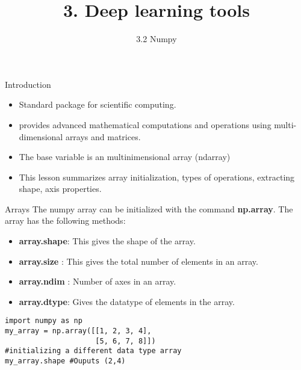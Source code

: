 \documentclass{beamer}
\title{3. Deep learning tools}
\subtitle{3.2 Numpy}
\begin{document}
\maketitle

\begin{frame}{Introduction}
\begin{itemize}
\item Standard package for scientific computing. 
\item provides advanced mathematical computations and operations using multi-dimensional arrays and matrices. 
\item The base variable is an multinimensional array (ndarray)
\item This lesson summarizes array initialization,  types of operations, extracting shape, axis properties.
\end{itemize}
\end{frame}

\begin{frame}[fragile]{Arrays}
The numpy array can be initialized with the command  \textbf{np.array}. The array has the following methods:
\begin{itemize}
    \item \textbf{array.shape}: This gives the shape of the array.
\item \textbf{array.size} : This gives the total number of elements in an array.
\item \textbf{array.ndim} : Number of axes in an array.
\item \textbf{array.dtype}: Gives the datatype of elements in the array.
\end{itemize}
\begin{lstlisting}
import numpy as np
my_array = np.array([[1, 2, 3, 4],
                     [5, 6, 7, 8]]) 
#initializing a different data type array
my_array.shape #Ouputs (2,4)
\end{lstlisting}
\end{frame}
\end{document}

